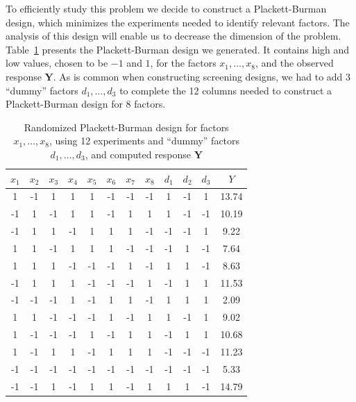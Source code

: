 \documentclass[conference]{IEEEtran}
\begin{document}
To efficiently study this problem we decide to construct a Plackett-Burman
design, which minimizes the experiments needed to identify relevant factors. The
analysis of this design will enable us to decrease the dimension of the problem.
Table~\ref{tab:plackett} presents the Plackett-Burman design we generated.
It contains high and low values, chosen to be \(-1\) and \(1\), for the factors
\(x_1,\dots,x_8\), and the observed response \(\mathbf{Y}\). As is common when
constructing screening designs, we had to add 3 ``dummy'' factors
\(d_1,\dots,d_3\) to complete the 12 columns needed to construct a Plackett-Burman
design for 8 factors.

\begin{table}[b]
\centering
\caption{Randomized Plackett-Burman design for factors $x_1, \dots, x_8$, using 12 experiments and ``dummy'' factors $d_1, \dots, d_3$, and computed response $\mathbf{Y}$}
\label{tab:plackett}
\begingroup\scriptsize
\begin{tabular}{cccccccccccc}
  \toprule
$x_1$ & $x_2$ & $x_3$ & $x_4$ & $x_5$ & $x_6$ & $x_7$ & $x_8$ & $d_1$ & $d_2$ & $d_3$ & $Y$ \\
  \midrule
1 & -1 & 1 & 1 & 1 & -1 & -1 & -1 & 1 & -1 & 1 & 13.74 \\
  -1 & 1 & -1 & 1 & 1 & -1 & 1 & 1 & 1 & -1 & -1 & 10.19 \\
  -1 & 1 & 1 & -1 & 1 & 1 & 1 & -1 & -1 & -1 & 1 & 9.22 \\
  1 & 1 & -1 & 1 & 1 & 1 & -1 & -1 & -1 & 1 & -1 & 7.64 \\
  1 & 1 & 1 & -1 & -1 & -1 & 1 & -1 & 1 & 1 & -1 & 8.63 \\
  -1 & 1 & 1 & 1 & -1 & -1 & -1 & 1 & -1 & 1 & 1 & 11.53 \\
  -1 & -1 & -1 & 1 & -1 & 1 & 1 & -1 & 1 & 1 & 1 & 2.09 \\
  1 & 1 & -1 & -1 & -1 & 1 & -1 & 1 & 1 & -1 & 1 & 9.02 \\
  1 & -1 & -1 & -1 & 1 & -1 & 1 & 1 & -1 & 1 & 1 & 10.68 \\
  1 & -1 & 1 & 1 & -1 & 1 & 1 & 1 & -1 & -1 & -1 & 11.23 \\
  -1 & -1 & -1 & -1 & -1 & -1 & -1 & -1 & -1 & -1 & -1 & 5.33 \\
  -1 & -1 & 1 & -1 & 1 & 1 & -1 & 1 & 1 & 1 & -1 & 14.79 \\
   \bottomrule
\end{tabular}
\endgroup
\end{table}
\end{document}
